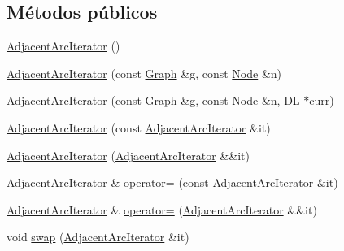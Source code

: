 \subsection*{Métodos públicos}
\begin{DoxyCompactItemize}
\item 
\hyperlink{class_designar_1_1_graph_1_1_adjacent_arc_iterator_a36fe9a05d139c9e44dc4ff6a47d41416}{Adjacent\+Arc\+Iterator} ()
\item 
\hyperlink{class_designar_1_1_graph_1_1_adjacent_arc_iterator_a2a16b2ab702ca71cf8561ea8ebc4ec72}{Adjacent\+Arc\+Iterator} (const \hyperlink{class_designar_1_1_graph}{Graph} \&g, const \hyperlink{class_designar_1_1_graph_a5dfc7dba9d092ac489c72e40390c37d0}{Node} \&n)
\item 
\hyperlink{class_designar_1_1_graph_1_1_adjacent_arc_iterator_a97e3e5909f6e9b9b6b55cbc0fb2d5263}{Adjacent\+Arc\+Iterator} (const \hyperlink{class_designar_1_1_graph}{Graph} \&g, const \hyperlink{class_designar_1_1_graph_a5dfc7dba9d092ac489c72e40390c37d0}{Node} \&n, \hyperlink{class_designar_1_1_d_l}{DL} $\ast$curr)
\item 
\hyperlink{class_designar_1_1_graph_1_1_adjacent_arc_iterator_af536d3124c826e57fdfd98b604338960}{Adjacent\+Arc\+Iterator} (const \hyperlink{class_designar_1_1_graph_1_1_adjacent_arc_iterator}{Adjacent\+Arc\+Iterator} \&it)
\item 
\hyperlink{class_designar_1_1_graph_1_1_adjacent_arc_iterator_afe1c65c9b34d57572217f33e4adc4200}{Adjacent\+Arc\+Iterator} (\hyperlink{class_designar_1_1_graph_1_1_adjacent_arc_iterator}{Adjacent\+Arc\+Iterator} \&\&it)
\item 
\hyperlink{class_designar_1_1_graph_1_1_adjacent_arc_iterator}{Adjacent\+Arc\+Iterator} \& \hyperlink{class_designar_1_1_graph_1_1_adjacent_arc_iterator_acd4f3584de04e7787b39b133bb9547ad}{operator=} (const \hyperlink{class_designar_1_1_graph_1_1_adjacent_arc_iterator}{Adjacent\+Arc\+Iterator} \&it)
\item 
\hyperlink{class_designar_1_1_graph_1_1_adjacent_arc_iterator}{Adjacent\+Arc\+Iterator} \& \hyperlink{class_designar_1_1_graph_1_1_adjacent_arc_iterator_a7dd872294198ccd6d38267629a65363f}{operator=} (\hyperlink{class_designar_1_1_graph_1_1_adjacent_arc_iterator}{Adjacent\+Arc\+Iterator} \&\&it)
\item 
void \hyperlink{class_designar_1_1_graph_1_1_adjacent_arc_iterator_a3a1ed1df16f67214b5664fe9e54f23f4}{swap} (\hyperlink{class_designar_1_1_graph_1_1_adjacent_arc_iterator}{Adjacent\+Arc\+Iterator} \&it)
\item 

\end{DoxyCompactItemize}
